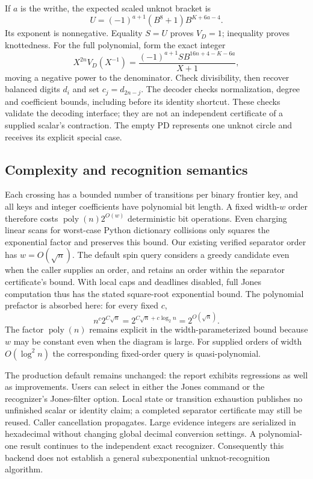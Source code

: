 If $a$ is the writhe, the expected scaled unknot bracket is
\[
 U=(-1)^{a+1}(B^8+1)B^{K+6a-4}.
\]
Its exponent is nonnegative. Equality $S=U$ proves $V_D=1$; inequality
proves knottedness. For the full polynomial, form the exact integer
\[
 X^{2n}V_D(X^{-1})
   =\frac{(-1)^{a+1}S B^{16n+4-K-6a}}{X+1},
\]
moving a negative power to the denominator. Check divisibility, then
recover balanced digits $d_i$ and set $c_j=d_{2n-j}$. The decoder checks
normalization, degree and coefficient bounds, including before its identity
shortcut. These checks validate the decoding interface; they are not an
independent certificate of a supplied scalar's contraction. The empty PD
represents one unknot circle and receives its explicit special case.

\subsection{Complexity and recognition semantics}
Each crossing has a bounded number of transitions per binary frontier key,
and all keys and integer coefficients have polynomial bit length. A fixed
width-$w$ order therefore costs $\operatorname{poly}(n)2^{O(w)}$
deterministic bit operations. Even charging linear scans for worst-case
Python dictionary collisions only squares the exponential factor and
preserves this bound. Our existing verified separator order has
$w=O(\sqrt n)$. The default spin query considers a greedy candidate even
when the caller supplies an order, and retains an order within the
separator certificate's bound. With local caps and deadlines disabled,
full Jones computation thus has the stated square-root exponential bound.
The polynomial prefactor is absorbed here: for every fixed $c$,
\[
 n^c 2^{C\sqrt n}=2^{C\sqrt n+c\log_2n}=2^{O(\sqrt n)}.
\]
The factor $\operatorname{poly}(n)$ remains explicit in the width-parameterized
bound because $w$ may be constant even when the diagram is large.
For supplied orders of width $O(\log^2 n)$ the corresponding fixed-order
query is quasi-polynomial.

The production default remains unchanged: the report exhibits regressions
as well as improvements. Users can select  in either
the Jones command or the recognizer's Jones-filter option. Local state or
transition exhaustion publishes no unfinished scalar or identity claim;
a completed separator certificate may still be reused. Caller cancellation
propagates. Large evidence integers are serialized in hexadecimal without
changing global decimal conversion settings. A polynomial-one result
continues to the independent exact recognizer. Consequently this backend
does not establish a general subexponential unknot-recognition algorithm.

